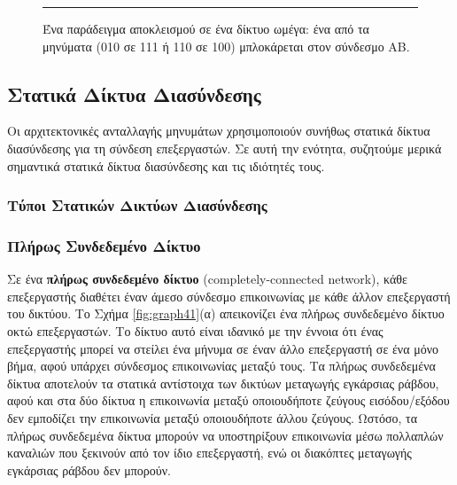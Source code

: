 \documentclass[12pt,a4paper]{article}
\begin{document}
\begin{figure}[H]
\noindent\rule{\textwidth}{0.2pt}
\caption{Ένα παράδειγμα αποκλεισμού σε ένα δίκτυο ωμέγα: ένα από τα μηνύματα
(010 σε 111 ή 110 σε 100) μπλοκάρεται στον σύνδεσμο ΑΒ.}
\label{fig:graph40}
\end{figure}
\vspace{0.3cm}

\subsection{Στατικά Δίκτυα Διασύνδεσης}
Οι αρχιτεκτονικές ανταλλαγής μηνυμάτων χρησιμοποιούν συνήθως στατικά 
δίκτυα διασύνδεσης για τη σύνδεση επεξεργαστών. Σε αυτή την ενότητα, 
συζητούμε μερικά σημαντικά στατικά δίκτυα διασύνδεσης και τις ιδιότητές τους.

\subsubsection{Τύποι Στατικών Δικτύων Διασύνδεσης}
\subsubsection*{Πλήρως Συνδεδεμένο Δίκτυο}
Σε ένα \textbf{πλήρως συνδεδεμένο δίκτυο} (\foreignlanguage{english}{completely-connected network}), 
κάθε επεξεργαστής διαθέτει έναν άμεσο σύνδεσμο επικοινωνίας με κάθε άλλον 
επεξεργαστή του δικτύου. Το Σχήμα \ref{fig:graph41}(α) απεικονίζει ένα 
πλήρως συνδεδεμένο δίκτυο οκτώ επεξεργαστών. Το δίκτυο αυτό είναι ιδανικό 
με την έννοια ότι ένας επεξεργαστής μπορεί να στείλει ένα μήνυμα σε έναν 
άλλο επεξεργαστή σε ένα μόνο βήμα, αφού υπάρχει σύνδεσμος επικοινωνίας 
μεταξύ τους. Τα πλήρως συνδεδεμένα δίκτυα αποτελούν τα στατικά αντίστοιχα 
των δικτύων μεταγωγής εγκάρσιας ράβδου, αφού και στα δύο δίκτυα η 
επικοινωνία μεταξύ οποιουδήποτε ζεύγους εισόδου/εξόδου δεν εμποδίζει την 
επικοινωνία μεταξύ οποιουδήποτε άλλου ζεύγους. Ωστόσο, τα 
πλήρως συνδεδεμένα δίκτυα μπορούν να υποστηρίξουν επικοινωνία μέσω 
πολλαπλών καναλιών που ξεκινούν από τον ίδιο επεξεργαστή, ενώ οι 
διακόπτες μεταγωγής εγκάρσιας ράβδου δεν μπορούν.
\end{document}
